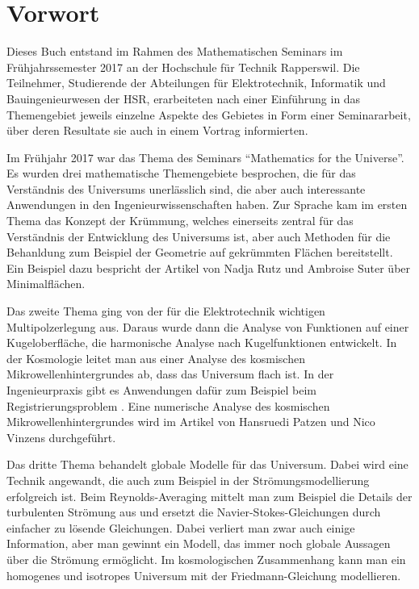 %
%
%
\chapter*{Vorwort}
\rhead{}
Dieses Buch entstand im Rahmen des Mathematischen Seminars
im Frühjahrssemester 2017 an der Hochschule für Technik Rapperswil.
Die Teilnehmer, Studierende der Abteilungen für Elektrotechnik,
Informatik und Bauingenieurwesen der
HSR, erarbeiteten nach einer Einführung in das Themengebiet jeweils
einzelne Aspekte des Gebietes in Form einer Seminararbeit, über
deren Resultate sie auch in einem Vortrag informierten. 

Im Frühjahr 2017 war das Thema des Seminars ``Mathematics for
the Universe''.
Es wurden drei mathematische Themengebiete besprochen, die für
das Verständnis des Universums unerlässlich sind, die aber auch
interessante Anwendungen in den Ingenieurwissenschaften haben.
Zur Sprache kam im ersten Thema das Konzept der Krümmung,
welches einerseits zentral für das Verständnis der Entwicklung
des Universums ist, aber auch Methoden für die Behanldung 
zum Beispiel der Geometrie auf gekrümmten Flächen bereitstellt.
Ein Beispiel dazu bespricht der Artikel von Nadja Rutz und Ambroise Suter
über Minimalflächen.

Das zweite Thema ging von der für die Elektrotechnik wichtigen
Multipolzerlegung aus.
Daraus wurde dann die Analyse von Funktionen auf einer Kugeloberfläche,
die harmonische Analyse nach Kugelfunktionen entwickelt.
In der Kosmologie leitet man aus einer Analyse des kosmischen
Mikrowellenhintergrundes ab, dass das Universum flach ist.
In der Ingenieurpraxis gibt es Anwendungen dafür zum Beispiel
beim Registrierungsproblem \cite{skript:tabea}.
Eine numerische Analyse des kosmischen Mikrowellenhintergrundes
wird im Artikel von Hansruedi Patzen und Nico Vinzens durchgeführt.

Das dritte Thema behandelt globale Modelle für das Universum.
Dabei wird eine Technik angewandt, die auch zum Beispiel in der
Strömungsmodellierung erfolgreich ist.
Beim Reynolds-Averaging mittelt man zum Beispiel die Details
der turbulenten Strömung aus und ersetzt die Navier-Stokes-Gleichungen
durch einfacher zu lösende Gleichungen.
Dabei verliert man zwar auch einige Information, aber man gewinnt
ein Modell, das immer noch globale Aussagen über die Strömung
ermöglicht.
Im kosmologischen Zusammenhang kann man ein homogenes und isotropes
Universum mit der Friedmann-Gleichung modellieren.

